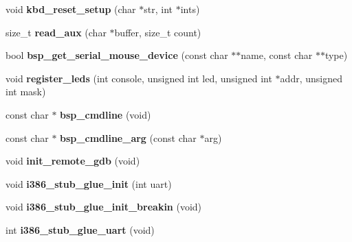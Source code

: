 \begin{DoxyCompactItemize}
\mbox{\label{group__RTEMSBSPsI386_gaa32dae4327998e43b239c51c62a0be78}} 
void {\bfseries kbd\+\_\+reset\+\_\+setup} (char $\ast$str, int $\ast$ints)
\item 
\mbox{\label{group__RTEMSBSPsI386_ga9a51406169f977490f0abf7e5ece4b8c}} 
size\+\_\+t {\bfseries read\+\_\+aux} (char $\ast$buffer, size\+\_\+t count)
\item 
\mbox{\label{group__RTEMSBSPsI386_ga7103f15e10a857e48f4f026a58968288}} 
bool {\bfseries bsp\+\_\+get\+\_\+serial\+\_\+mouse\+\_\+device} (const char $\ast$$\ast$name, const char $\ast$$\ast$type)
\item 
\mbox{\label{group__RTEMSBSPsI386_ga539a49ac3ee67ad35ae2e90128f80bd4}} 
void {\bfseries register\+\_\+leds} (int console, unsigned int led, unsigned int $\ast$addr, unsigned int mask)
\item 
\mbox{\label{group__RTEMSBSPsI386_ga505670a3f8ffa8bfcdc846e28be45ff0}} 
const char $\ast$ {\bfseries bsp\+\_\+cmdline} (void)
\item 
\mbox{\label{group__RTEMSBSPsI386_ga2601d170328dc0331b112a0722c7039c}} 
const char $\ast$ {\bfseries bsp\+\_\+cmdline\+\_\+arg} (const char $\ast$arg)
\item 
\mbox{\label{group__RTEMSBSPsI386_ga8f12ac034e8f358361e13b968906a755}} 
void {\bfseries init\+\_\+remote\+\_\+gdb} (void)
\item 
\mbox{\label{group__RTEMSBSPsI386_ga61962d59a137f2168e1de52ce66fb3bd}} 
void {\bfseries i386\+\_\+stub\+\_\+glue\+\_\+init} (int uart)
\item 
\mbox{\label{group__RTEMSBSPsI386_gabbce798c3e1bb054ae9fbabc05728948}} 
void {\bfseries i386\+\_\+stub\+\_\+glue\+\_\+init\+\_\+breakin} (void)
\item 
\mbox{\label{group__RTEMSBSPsI386_ga2971ecb54870b9420fed114e347b9c3e}} 
int {\bfseries i386\+\_\+stub\+\_\+glue\+\_\+uart} (void)
\item 

\end{DoxyCompactItemize}
